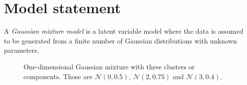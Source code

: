 \section{Model statement}

A \emph{Gaussian mixture model} is a latent variable model where the data is assumed to be generated from a finite number of Gaussian distributions with unknown parameters.

\begin{figure}[h!]
  \centering
  \caption{One-dimensional Gaussian mixture with three clusters or components. Those are \(\mathcal{N}(0, 0.5)\), \(\mathcal{N}(2, 0.75)\) and \(\mathcal{N}(3, 0.4)\).}
\end{figure}


